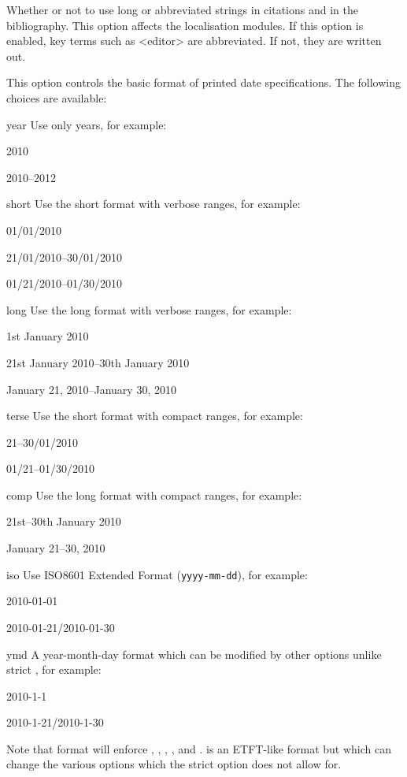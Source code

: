 \documentclass{ltxdockit}[2011/03/25]
\begin{document}
\begin{optionlist}

Whether or not to use long or abbreviated strings in citations and in the bibliography. This option affects the localisation modules. If this option is enabled, key terms such as <editor> are abbreviated. If not, they are written out.


This option controls the basic format of printed date specifications. The following choices are available:

\begin{valuelist}
\item[year] Use only years, for example:\par
2010\par
2010--2012\par
\item[short] Use the short format with verbose ranges, for example:\par
01/01/2010\par
21/01/2010--30/01/2010\par
01/21/2010--01/30/2010
\item[long] Use the long format with verbose ranges, for example:\par
1st January 2010\par
21st January 2010--30th January 2010\par
January 21, 2010--January 30, 2010\par
\item[terse] Use the short format with compact ranges, for example:\par
21--30/01/2010\par
01/21--01/30/2010
\item[comp] Use the long format with compact ranges, for example:\par
21st--30th January 2010\par
January 21--30, 2010\par
\item[iso] Use ISO8601 Extended Format (\texttt{yyyy-mm-dd}), for example:\par
2010-01-01\par
2010-01-21/2010-01-30
\item[ymd] A year-month-day format which can be modified by other options unlike strict , for example:\par
2010-1-1\par
2010-1-21/2010-1-30
\end{valuelist}
%
Note that  format will enforce , , , ,  and .  is an ETFT-like format but which can change the various options which the strict  option does not allow for.


\end{optionlist}
\end{document}
